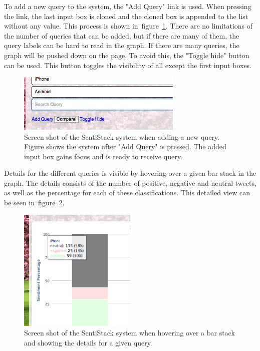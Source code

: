 To add a new query to the system, the "Add Query" link is used. When pressing the link, the last input box is cloned and the cloned box is appended to the list without any value. This process is shown in~figure~\ref{fig:sentistack_addquery}. There are no limitations of the number of queries that can be added, but if there are many of them, the query labels can be hard to read in the graph. If there are many queries, the graph will be pushed down on the page. To avoid this, the "Toggle hide" button can be used. This button toggles the visibility of all except the first input boxes. 

\begin{figure}[htb!]
\begin{center}
 \includegraphics[width=0.7\textwidth]{../img/sentistack_addquery.png}
 \caption[SentiStack add new query screen shot]{Screen shot of the SentiStack system when adding a new query. Figure shows the system after "Add Query" is pressed. The added input box gains focus and is ready to receive query.}
 \label{fig:sentistack_addquery}
\end{center}
\end{figure}

Details for the different queries is visible by hovering over a given bar stack in the graph. The details consists of the number of positive, negative and neutral tweets, as well as the percentage for each of these classifications. This detailed view can be seen in~figure~\ref{fig:sentistack_details}.

\begin{figure}[htb!]
\begin{center}
 \includegraphics[width=0.5\textwidth]{../img/sentistack_details.png}
 \caption[SentiStack detailed view screen shot]{Screen shot of the SentiStack system  when hovering over a bar stack and showing the details for a given query.}
 \label{fig:sentistack_details}
\end{center}
\end{figure}